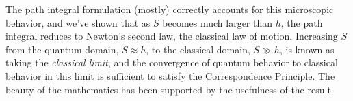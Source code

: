 \documentclass{amsart}
\begin{document}

The path integral formulation (mostly) correctly accounts for this microscopic behavior, and we've shown that as $S$ becomes much larger than $h$, the path integral reduces to Newton's second law, the classical law of motion.  Increasing $S$ from the quantum domain, $S \approx h$, to the classical domain, $S \gg h$, is known as taking the \emph{classical limit}, and the convergence of quantum behavior to classical behavior in this limit is sufficient to satisfy the Correspondence Principle.  The beauty of the mathematics has been supported by the usefulness of the result.
\end{document}
